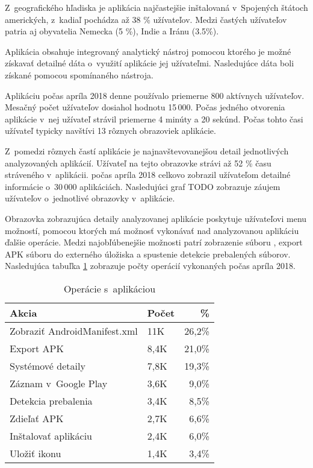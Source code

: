 Z~geografického hľadiska je aplikácia najčastejšie inštalovaná v~Spojených štátoch amerických, z~kadiaľ pochádza až 38 \% užívateľov. Medzi častých užívateľov patria aj obyvatelia Nemecka (5 \%), Indie a Iránu (3.5\%). 

Aplikácia obsahuje integrovaný analytický nástroj  pomocou ktorého je možné získavať detailné dáta o~využití aplikácie jej užívateľmi. Nasledujúce dáta boli získané pomocou spomínaného nástroja.

Aplikáciu počas apríla 2018 denne používalo priemerne 800 aktívnych užívateľov. Mesačný počet užívateľov dosiahol hodnotu 15\,000. Počas jedného otvorenia aplikácie v~nej užívateľ strávil priemerne 4 minúty a 20 sekúnd. Počas tohto časi užívateľ typicky navštívi 13 rôznych obrazoviek aplikácie. 

Z~pomedzi rôznych častí aplikácie je najnavštevovanejšou detail jednotlivých analyzovaných aplikácií. Užívateľ na tejto obrazovke strávi až 52 \% času stráveného v~aplikácii.  počas apríla 2018 celkovo zobrazil užívateľom detailné informácie o~30\,000 aplikáciách.  Nasledujúci graf TODO zobrazuje záujem užívateľov o~jednotlivé obrazovky v~aplikácie.

Obrazovka zobrazujúca detaily analyzovanej aplikácie poskytuje užívateľovi menu možností, pomocou ktorých má možnosť vykonávať nad analyzovanou aplikáciu ďalšie operácie. Medzi najobľúbenejšie možnosti patrí zobrazenie súboru , export APK súboru do externého úložiska a spustenie detekcie prebalených súborov.  Nasledujúca tabuľka \ref{app-ops} zobrazuje počty operácií vykonaných počas apríla 2018.

\begin{table}[]
\centering
\begin{tabular}{|l|l|r|}
\hline
\textbf{Akcia}                        & \textbf{Počet} & \textbf{\%}    \\ \hline
Zobraziť AndroidManifest.xml & 11K  & 26,2\% \\
Export APK                   & 8,4K  & 21,0\% \\
Systémové detaily            & 7,8K  & 19,3\% \\
Záznam v~Google Play         & 3,6K  & 9,0\% \\
Detekcia prebalenia          & 3,4K  & 8,5\%  \\
Zdieľať APK                  & 2,7K   & 6,6\%  \\
Inštalovať aplikáciu         & 2,4K   & 6,0\%  \\
Uložiť ikonu                 & 1,4K   & 3,4\%  \\ \hline
\end{tabular}
\caption{Operácie s~aplikáciou}
\label{app-ops}
\end{table}



